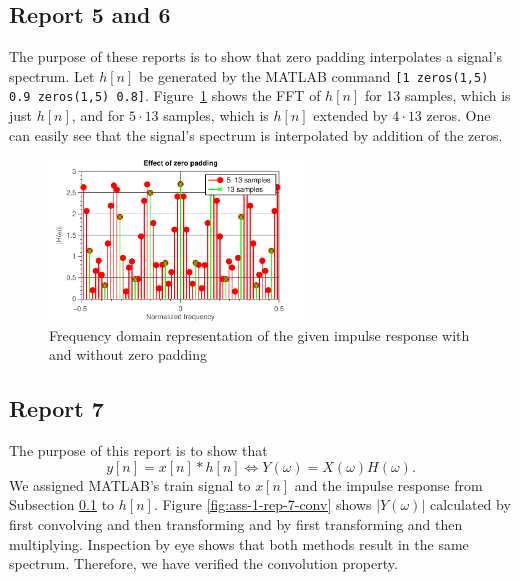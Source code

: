 \documentclass[11pt,titlepage]{report}
\begin{document}
\subsection{Report 5 and 6}
\label{subsec:5-6}
The purpose of these reports is to show that zero padding interpolates a signal's spectrum. Let $h[n]$ be generated by the MATLAB command \texttt{[1  zeros(1,5)  0.9 zeros(1,5)  0.8]}. Figure~\ref{fig:ass-1-rep-5-6} shows the FFT of $h[n]$ for \num{13} samples, which is just $h[n]$, and for $5 \cdot 13$ samples, which is $h[n]$ extended by $4 \cdot 13$ zeros. One can easily see that the signal's spectrum is interpolated by addition of the zeros.

\begin{figure}[H]
	\centering
	\includegraphics[width=0.6\textwidth]{../../deliverable-7-resources/figures/ass-1/report-5-6/ass-1-report-5-6.pdf}
	\caption{Frequency domain representation of the given impulse response with and without zero padding}
	\label{fig:ass-1-rep-5-6}
\end{figure}

\subsection{Report 7}
The purpose of this report is to show that
\[
	y[n] = x[n]*h[n] \Leftrightarrow Y(\omega) = X(\omega)H(\omega).
\]
We assigned MATLAB's train signal to $x[n]$ and the impulse response from Subsection \ref{subsec:5-6} to $h[n]$. Figure \ref{fig:ass-1-rep-7-conv} shows $|Y(\omega)|$ calculated by first convolving and then transforming and by first transforming and then multiplying. Inspection by eye shows that both methods result in the same spectrum. Therefore, we have verified the convolution property.
\end{document}
